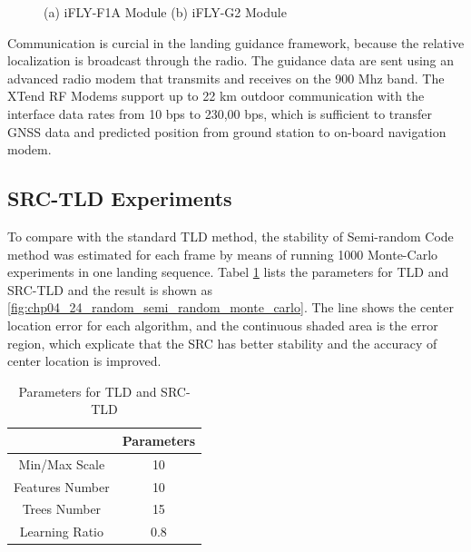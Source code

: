 \begin{figure}[!tb]
	\centering
	
	\caption{(a) iFLY-F1A Module   (b) iFLY-G2 Module}
\end{figure}

Communication is curcial in the landing guidance framework, because the relative localization is broadcast through the radio. The guidance data are sent using an advanced radio modem that transmits and receives on the 900 Mhz band. The XTend RF Modems support up to 22 km outdoor communication with the interface data rates from 10 bps to 230,00 bps, which is sufficient to transfer GNSS data and predicted position from ground station to on-board navigation modem.

 



\subsection{SRC-TLD Experiments}
To compare with the standard TLD method, the stability of Semi-random Code method was estimated for each frame by means of running 1000 Monte-Carlo experiments in one landing sequence. Tabel \ref{lab:TLD_params} lists the parameters for TLD and SRC-TLD and the result is shown as \ref{fig:chp04_24_random_semi_random_monte_carlo}. The line shows the center location error for each algorithm, and the continuous shaded area is the error region, which explicate that the SRC has better stability and the accuracy of center location is improved. 

\begin{table}[!ht]
	\centering
	\caption{Parameters for TLD and SRC-TLD}
	\label{lab:TLD_params}
	\begin{tabular}{cc}
		\hline
		& \textbf{Parameters} \\ \hline
		Min/Max Scale & 10 \\
		Features Number & 10 \\
		Trees Number & 15 \\
		Learning Ratio & 0.8 \\ \hline
	\end{tabular}
\end{table}

